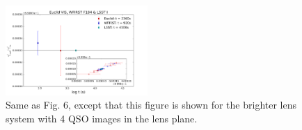 \documentclass[a4paper,11pt]{article}
\begin{document}
\begin{figure}
\begin{center}
\includegraphics[width=0.48\textwidth]{figures/gamma_0330_anti_4QSOimages_EWL.png}
\end{center}
\caption{Same as Fig. 6, except that this figure is shown for the brighter lens system with 4 QSO images in the lens plane.}
\label{fig:gamma_brighter_4QSOimages}
\end{figure}
\end{document}
